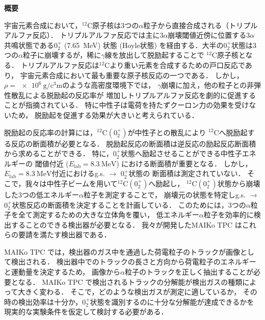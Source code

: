 \documentclass[./master]{subfiles}
\begin{document}
\mbox{}

\begin{center}\LARGE\textbf{概要}\end{center}
\vspace{\baselineskip}

  宇宙元素合成において，${}^{12}\mathrm{C}$原子核は3つの$\alpha$粒子から直接合成される（トリプルアルファ反応）．
  トリプルアルファ反応では主に3$\alpha$崩壊閾値近傍に位置する3$\alpha$共鳴状態である$0_2^+$ (\SI{7.65}{\mega\electronvolt})
  状態 (Hoyle状態) を経由する．大半の$0_2^+$状態は3つの$\alpha$粒子に崩壊するが，稀に$\gamma$線を放出して脱励起することで
  ${}^{12}\mathrm{C}$原子核となる．
  トリプルアルファ反応は${}^{12}\mathrm{C}$より重い元素を合成するための戸口反応であり，
  宇宙元素合成において最も重要な原子核反応の一つである．
  しかし，$\rho = \SI{e6}{\gram\per\cubic\centi\metre}$のような高密度環境下では，
  $\gamma$崩壊に加え，他の粒子との非弾性散乱による脱励起の反応率が
  増加しトリプルアルファ反応を劇的に促進することが指摘されている．
  特に中性子は電荷を持たずクーロン力の効果を受けないため，
  脱励起を促進する効果が大きいと考えられている．

  脱励起の反応率の計算には，${}^{12}\mathrm{C} (0_2^+)$が中性子との散乱により
  ${}^{12}\mathrm{C}$へ脱励起する反応の断面積が必要となる．
  脱励起反応の断面積は逆反応の励起反応断面積から求めることができる．
  特に，$0_2^+$状態へ励起させることができる中性子エネルギーの
  閾値付近 ($E_{\text{lab}} = \SI{8.3}{\mega\electronvolt}$) における断面積が重要となる．
  しかし，$E_{\text{lab}} = \SI{8.3}{\mega\electronvolt}$付近におけるg.s. $\rightarrow$ $0_2^+$状態の
  断面積は測定されていない．
  そこで，我々は中性子ビームを用いて${}^{12}\mathrm{C} (0_2^+)$へ励起し，
  ${}^{12}\mathrm{C} (0_2^+)$状態から崩壊した3つの低エネルギー$\alpha$粒子を測定することで，
  崩壊元の状態を特定しg.s. $\rightarrow$ $0_2^+$状態反応の断面積を決定することを計画している．
  このためには，3つの$\alpha$粒子を全て測定するための大きな立体角を覆い，
  低エネルギー$\alpha$粒子を効率的に検出することのできる検出器が必要となる．
  我々が開発したMAIKo TPC はこれらの要請を満たす検出器である．

  MAIKo TPC では，検出器のガス中を通過した荷電粒子のトラックが画像として検出される．
  検出器中でのトラックの長さと方向から荷電粒子のエネルギーと運動量を決定するため，
  画像から$\alpha$粒子のトラックを正しく抽出することが必要となる．
  MAIKo TPC で検出されるトラックの分解能が検出ガスの種類によって大きく変わる．
  そこで，どのような検出ガスが測定に適しているか，
  その時の検出効率は十分か，$0_2^+$状態を識別するのに十分な分解能が達成できるかを
  現実的な実験条件を仮定して検討する必要がある．
\end{document}
